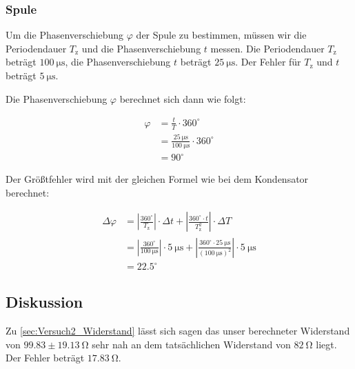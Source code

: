         \subsubsection{Spule}
        \label{sec:Versuch2_Spule}
            
            Um die Phasenverschiebung $\varphi$ der Spule zu bestimmen, müssen wir die Periodendauer $T_{\mathrm{z}}$ und die Phasenverschiebung $t$ messen.
            Die Periodendauer $T_{\mathrm{z}}$ beträgt $100\ \mathrm{\mu s}$, die Phasenverschiebung $t$ beträgt $25\ \mathrm{\mu s}$. Der Fehler für $T_{\mathrm{z}}$ und $t$ beträgt $5\ \mathrm{\mu s}$.

            Die Phasenverschiebung $\varphi$ berechnet sich dann wie folgt:

            \begin{equation}
                \begin{aligned}
                    \varphi &= \frac{t}{T} \cdot 360^{\circ}\\
                         &= \frac{25\ \mathrm{\mu s}}{100\ \mathrm{\mu s}} \cdot 360^{\circ}\\
                         &= 90^{\circ}
                \end{aligned}
                \label{eq:Versuch2_Spule_Phasenverschiebung}
            \end{equation}

            Der Größtfehler wird mit der gleichen Formel wie bei dem Kondensator berechnet:

            \begin{equation}
                \begin{aligned}
                    \Delta \varphi &= \left|\frac{360^{\circ}}{T_{\mathrm{z}}}\right| \cdot \Delta t + \left|\frac{360^{\circ} \cdot t}{T_{\mathrm{z}}^{2}}\right| \cdot \Delta T\\
                                   &= \left|\frac{360^{\circ}}{100\ \mathrm{\mu s}}\right| \cdot 5\ \mathrm{\mu s} + \left|\frac{360^{\circ} \cdot 25\ \mathrm{\mu s}}{(100\ \mathrm{\mu s})^{2}}\right| \cdot 5\ \mathrm{\mu s}\\
                                   &= 22.5^{\circ}
                \end{aligned}
                \label{eq:Versuch2_Spule_Phasenverschiebung_Fehler}
            \end{equation}
             \subsection{Diskussion}
             Zu \ref{sec:Versuch2_Widerstand} lässt sich sagen das unser berechneter Widerstand von $99.83 \pm 19.13\ \mathrm{\Omega}$ sehr nah an dem tatsächlichen Widerstand von $82\ \mathrm{\Omega}$ liegt. Der Fehler beträgt $17.83\ \mathrm{\Omega}$.

